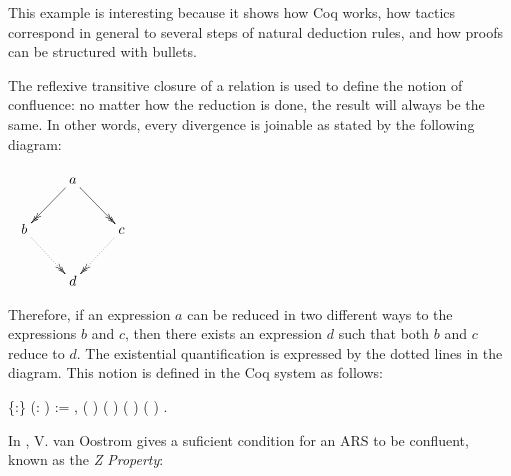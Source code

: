 This example is interesting because it shows how Coq works, how
tactics correspond in general to several steps of natural deduction
rules, and how proofs can be structured with bullets. \begin{coqdoccode}
\coqdocemptyline
\coqdocemptyline
\end{coqdoccode}
The reflexive transitive closure of a relation is used to define
    the notion of confluence: no matter how the reduction is done, the
    result will always be the same. In other words, every divergence
    is joinable as stated by the following diagram:


    $\begin{tabular}{c} \xymatrix{ & a \ar@{->>}[dl] \ar@{->>}[dr] &
    \\ b \ar@{.>>}[dr] & & c \ar@{.>>}[dl] \\ & d & } \end{tabular}$


    Therefore, if an expression $a$ can be reduced in two different
    ways to the expressions $b$ and $c$, then there exists an
    expression $d$ such that both $b$ and $c$ reduce to $d$. The
    existential quantification is expressed by the dotted lines in the
    diagram. This notion is defined in the Coq system as follows: \begin{coqdoccode}
\coqdocemptyline
\coqdocnoindent
{}  \{:\} (:  ) := \coqdockw{\ensuremath{\forall}}   , ( )    ( )      ( )    ( )  .\coqdoceol
\coqdocemptyline
\end{coqdoccode}
In \cite{ZPropertyDraft}, V. van Oostrom gives a suficient
    condition for an ARS to be confluent, known as the \textit{Z Property}:


